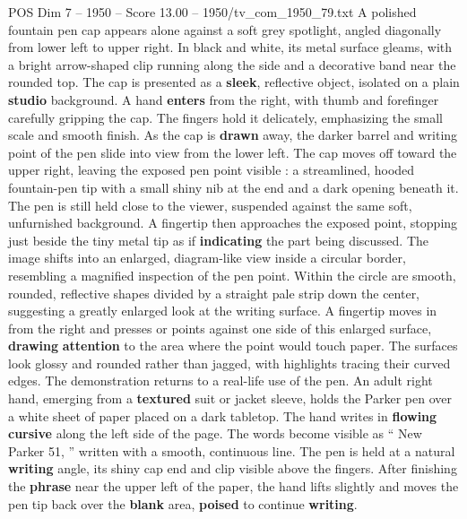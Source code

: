 \begin{textsample}{POS Dim 7 – 1950 – Score 13.00 – 1950/tv\_com\_1950\_79.txt}  \label{ex:f7_pos_019}
A polished fountain pen cap appears alone against a soft grey spotlight, angled diagonally from lower left to upper right.
In black and white, its metal surface gleams, with a bright arrow-shaped clip running along the side and a decorative band near the rounded top.
The cap is presented as a \textbf{sleek}, reflective object, isolated on a plain \textbf{studio} background.
A hand \textbf{enters} from the right, with thumb and forefinger carefully gripping the cap.
The fingers hold it delicately, emphasizing the small scale and smooth finish.
As the cap is \textbf{drawn} away, the darker barrel and writing point of the pen slide into view from the lower left.
The cap moves off toward the upper right, leaving the exposed pen point visible : a streamlined, hooded fountain-pen tip with a small shiny nib at the end and a dark opening beneath it.
The pen is still held close to the viewer, suspended against the same soft, unfurnished background.
A fingertip then approaches the exposed point, stopping just beside the tiny metal tip as if \textbf{indicating} the part being discussed.
The image shifts into an enlarged, diagram-like view inside a circular border, resembling a magnified inspection of the pen point.
Within the circle are smooth, rounded, reflective shapes divided by a straight pale strip down the center, suggesting a greatly enlarged look at the writing surface.
A fingertip moves in from the right and presses or points against one side of this enlarged surface, \textbf{drawing} \textbf{attention} to the area where the point would touch paper.
The surfaces look glossy and rounded rather than jagged, with highlights tracing their curved edges.
The demonstration returns to a real-life use of the pen.
An adult right hand, emerging from a \textbf{textured} suit or jacket sleeve, holds the Parker pen over a white sheet of paper placed on a dark tabletop.
The hand writes in \textbf{flowing} \textbf{cursive} along the left side of the page.
The words become visible as “ New Parker 51, ” written with a smooth, continuous line.
The pen is held at a natural \textbf{writing} angle, its shiny cap end and clip visible above the fingers.
After finishing the \textbf{phrase} near the upper left of the paper, the hand lifts slightly and moves the pen tip back over the \textbf{blank} area, \textbf{poised} to continue \textbf{writing}.

\end{textsample}
